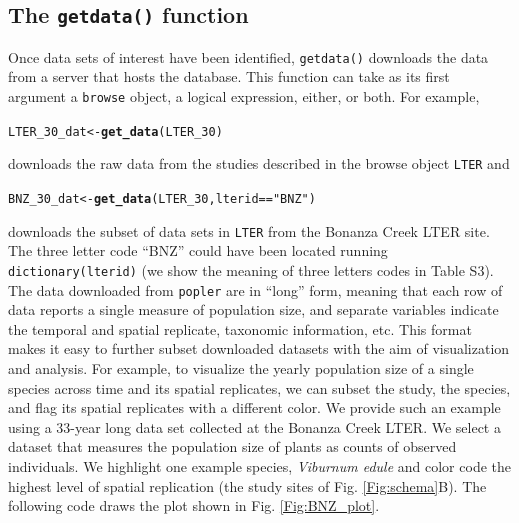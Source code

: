 \documentclass{article}\usepackage[]{graphicx}\usepackage[]{color}
\makeatletter
\newcommand{\hlstr}[1]{\textcolor[rgb]{0.192,0.494,0.8}{#1}}%
\newcommand{\hlopt}[1]{\textcolor[rgb]{0,0,0}{#1}}%
\newcommand{\hlstd}[1]{\textcolor[rgb]{0.345,0.345,0.345}{#1}}%
\newcommand{\hlkwb}[1]{\textcolor[rgb]{0.69,0.353,0.396}{#1}}%
\newcommand{\hlkwd}[1]{\textcolor[rgb]{0.737,0.353,0.396}{\textbf{#1}}}%
\newenvironment{kframe}{%
 \def\at@end@of@kframe{}%
 \ifinner\ifhmode%
  \def\at@end@of@kframe{\end{minipage}}%
  \begin{minipage}{\columnwidth}%
 \fi\fi%
 \def\FrameCommand##1{\hskip\@totalleftmargin \hskip-\fboxsep
 \colorbox{shadecolor}{##1}\hskip-\fboxsep
     \hskip-\linewidth \hskip-\@totalleftmargin \hskip\columnwidth}%
 \MakeFramed {\advance\hsize-\width
   \@totalleftmargin\z@ \linewidth\hsize
   \@setminipage}}%
 {\par\unskip\endMakeFramed%
 \at@end@of@kframe}
\newenvironment{knitrout}{}{} %
\makeatother
\begin{document}
\subsection*{The \texttt{get\textunderscore data()} function}

Once data sets of interest have been identified, \texttt{get\textunderscore data()} downloads the data from a server that hosts the database. This function can take as its first argument a \texttt{browse} object, a logical expression, either, or both. For example, %
\begin{knitrout}
\color{fgcolor}\begin{kframe}
\begin{alltt}
\hlstd{LTER_30_dat} \hlkwb{<-} \hlkwd{get_data}\hlstd{(LTER_30)}
\end{alltt}
\end{kframe}
\end{knitrout}
downloads the raw data from the studies described in the browse object \texttt{LTER} and 
\begin{knitrout}
\color{fgcolor}\begin{kframe}
\begin{alltt}
\hlstd{BNZ_30_dat} \hlkwb{<-} \hlkwd{get_data}\hlstd{(LTER_30,lterid} \hlopt{==} \hlstr{"BNZ"}\hlstd{)}
\end{alltt}
\end{kframe}
\end{knitrout}
downloads the subset of data sets in \texttt{LTER} from the Bonanza Creek LTER site. The three letter code ``BNZ'' could have been located running \texttt{dictionary(lterid)} (we show the meaning of three letters codes in Table S3). The data downloaded from \texttt{popler} are in ``long'' form, meaning that each row of data reports a single measure of population size, and separate variables indicate the temporal and spatial replicate, taxonomic information, etc. This format makes it easy to further subset downloaded datasets with the aim of visualization and analysis. For example, to visualize the yearly population size of a single species across time and its spatial replicates, we can subset the study, the species, and flag its spatial replicates with a different color. We provide such an example using a 33-year long data set collected at the Bonanza Creek LTER. We select a dataset that measures the population size of plants as counts of observed individuals. We highlight one example species, \textit{Viburnum edule} and color code the highest level of spatial replication (the study sites of Fig. \ref{Fig:schema}B). The following code draws the plot shown in Fig. \ref{Fig:BNZ_plot}.
\end{document}
